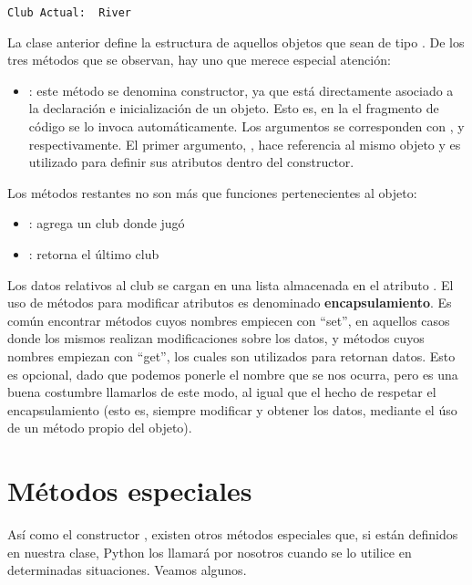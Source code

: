 \documentclass[a4paper,12pt,spanish]{sphinxmanual}
\begin{document}
\begin{Verbatim}[commandchars=\\\{\}]
Club Actual:  River
\end{Verbatim}

La clase anterior define la estructura de aquellos objetos que sean de
tipo . De los tres métodos que se observan, hay uno que
merece especial atención:
\begin{itemize}
\item {} 
: este método se denomina constructor, ya que está
directamente asociado a la declaración e inicialización de un objeto.
Esto es, en la el fragmento de código
 se lo
invoca automáticamente. Los argumentos se corresponden con
,  y  respectivamente. El primer
argumento, , hace referencia al mismo objeto y es utilizado
para definir sus atributos dentro del constructor.

\end{itemize}

Los métodos restantes no son más que funciones pertenecientes al objeto:
\begin{itemize}
\item {} 
: agrega un club donde jugó

\item {} 
: retorna el último club

\end{itemize}

Los datos relativos al club se cargan en una lista almacenada en el
atributo . El uso de métodos para modificar atributos es
denominado \textbf{encapsulamiento}. Es común encontrar métodos cuyos nombres
empiecen con ``set'', en aquellos casos donde los mismos realizan
modificaciones sobre los datos, y métodos cuyos nombres empiezan con
``get'', los cuales son utilizados para retornan datos. Esto es opcional,
dado que podemos ponerle el nombre que se nos ocurra, pero es una buena
costumbre llamarlos de este modo, al igual que el hecho de respetar el
encapsulamiento (esto es, siempre modificar y obtener los datos,
mediante el úso de un método propio del objeto).


\section{Métodos especiales}
\label{Unidad05:metodos-especiales}
Así como el constructor , existen otros métodos especiales
que, si están definidos en nuestra clase, Python los llamará por
nosotros cuando se lo utilice en determinadas situaciones. Veamos
algunos.
\end{document}
